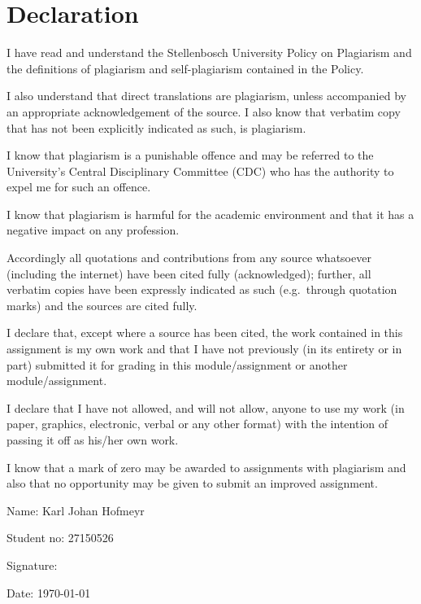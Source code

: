 \chapter*{Declaration}

I have read and understand the Stellenbosch University Policy on Plagiarism and the definitions of plagiarism and self-plagiarism contained in the Policy.

I also understand that direct translations are plagiarism, unless accompanied by an appropriate acknowledgement of the source. I also know that verbatim copy that has not been explicitly indicated as such, is plagiarism.

I know that plagiarism is a punishable offence and may be referred to the University's Central Disciplinary Committee (CDC) who has the authority to expel me for such an offence.

I know that plagiarism is harmful for the academic environment and that it has a negative impact on any profession.

Accordingly all quotations and contributions from any source whatsoever (including the internet) have been cited fully (acknowledged); further, all verbatim copies have been expressly indicated as such (e.g.\ through quotation marks) and the sources are cited fully.

I declare that, except where a source has been cited, the work contained in this assignment is my own work and that I have not previously (in its entirety or in part) submitted it for grading in this module/assignment or another module/assignment.

I declare that I have not allowed, and will not allow, anyone to use my work (in paper, graphics, electronic, verbal or any other format) with the intention of passing it off as his/her own work.

I know that a mark of zero may be awarded to assignments with plagiarism and also that no opportunity may be given to submit an improved assignment.

\vspace{1cm}

Name: Karl Johan Hofmeyr

Student no: 27150526

Signature: \hrulefill

Date: \today
